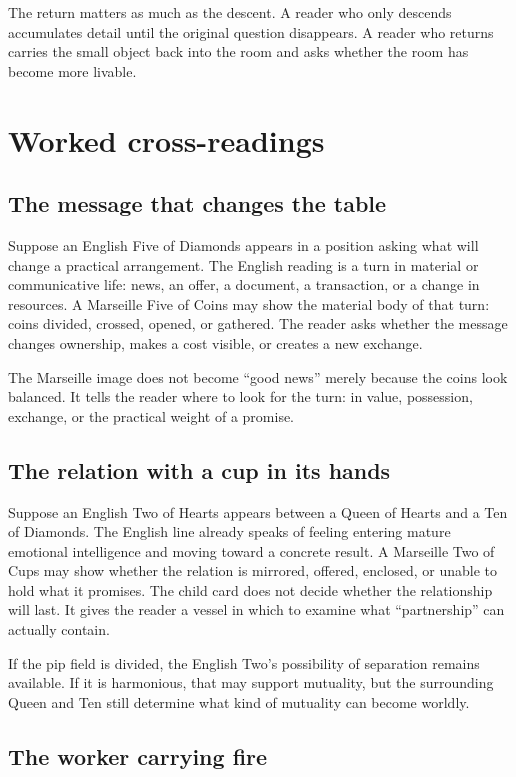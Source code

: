 The return matters as much as the descent. A reader who only descends accumulates
detail until the original question disappears. A reader who returns carries the
small object back into the room and asks whether the room has become more
livable.

\section{Worked cross-readings}

\subsection{The message that changes the table}

Suppose an English Five of Diamonds appears in a position asking what will
change a practical arrangement. The English reading is a turn in material or
communicative life: news, an offer, a document, a transaction, or a change in
resources. A Marseille Five of Coins may show the material body of that turn:
coins divided, crossed, opened, or gathered. The reader asks whether the
message changes ownership, makes a cost visible, or creates a new exchange.

The Marseille image does not become ``good news'' merely because the coins look
balanced. It tells the reader where to look for the turn: in value, possession,
exchange, or the practical weight of a promise.

\subsection{The relation with a cup in its hands}

Suppose an English Two of Hearts appears between a Queen of Hearts and a Ten of
Diamonds. The English line already speaks of feeling entering mature emotional
intelligence and moving toward a concrete result. A Marseille Two of Cups may
show whether the relation is mirrored, offered, enclosed, or unable to hold
what it promises. The child card does not decide whether the relationship will
last. It gives the reader a vessel in which to examine what ``partnership'' can
actually contain.

If the pip field is divided, the English Two's possibility of separation remains
available. If it is harmonious, that may support mutuality, but the surrounding
Queen and Ten still determine what kind of mutuality can become worldly.

\subsection{The worker carrying fire}

